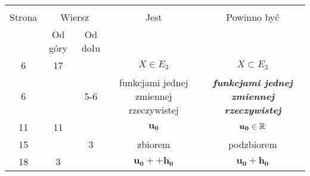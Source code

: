 \documentclass[a4paper,11pt]{article}
\begin{document}
\begin{center}

  \begin{tabular}{|c|c|c|c|c|}
    \hline
    & \multicolumn{2}{c|}{} & & \\
    Strona & \multicolumn{2}{c|}{Wiersz} & Jest
                              & Powinno być \\ \cline{2-3}
    & Od góry & Od dołu & & \\
    \hline
    6   & 17 & & $X \in E_{ 3 }$ & $X \subset E_{ 3 }$ \\
    6   & & 5-6 & funkcjami jednej zmiennej rzeczywistej
           & \textbf{\textit{funkcjami jednej zmiennej rzeczywistej}} \\
    11  & 11 & & $\boldsymbol{u_{ 0 }}$ & $\boldsymbol{u_{ 0 }} \in \mathbb{R}$ \\
    15  & &  3 & zbiorem & podzbiorem \\
    18  &  3 & & $\boldsymbol{u_{ 0 }} + + \boldsymbol{h_{ 0 }}$
           & $\boldsymbol{u_{ 0 }} + \boldsymbol{h_{ 0 }}$ \\
    \hline
  \end{tabular}

\end{center}

\vspace{\spaceTwo}






















\end{document}
